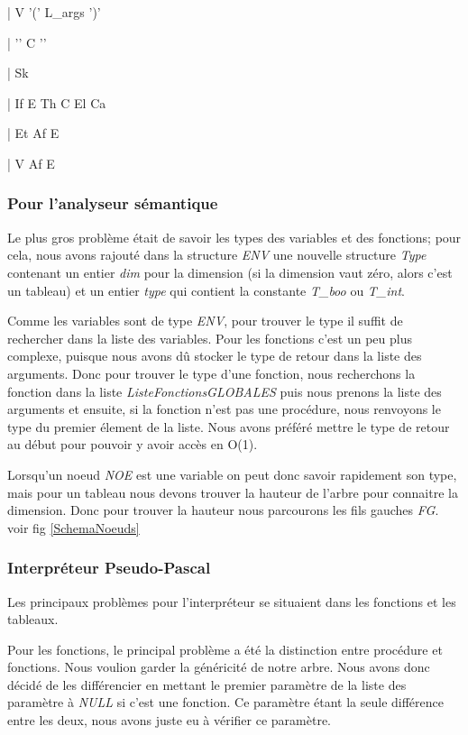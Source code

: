 \documentclass[10pt,a4paper]{article}
\begin{document}
| V '(' L\_args ')'
    
| '{' C '}'
    
| Sk
    
| If E Th C El Ca
    
| Et Af E

| V Af E



\subsubsection {Pour l'analyseur sémantique}
Le plus gros problème était de savoir les types des variables et des fonctions; pour cela, nous avons rajouté dans la structure \textit{ENV} une nouvelle structure \textit{Type} contenant un entier \textit{dim} pour la dimension (si la dimension vaut zéro, alors c'est un tableau) et un entier \textit{type} qui contient la constante \textit{T\_boo} ou \textit{T\_int}.

Comme les variables sont de type \textit{ENV}, pour trouver le type il suffit de rechercher dans la liste des variables. Pour les fonctions c'est un peu plus complexe, puisque nous avons dû stocker le type de retour dans la liste des arguments. Donc pour trouver le type d'une fonction, nous recherchons la fonction dans la liste \textit{ListeFonctionsGLOBALES} puis nous prenons la liste des arguments et ensuite, si la fonction n'est pas une procédure, nous renvoyons le type du premier élement de la liste. Nous avons préféré mettre le type de retour au début pour pouvoir y avoir accès en O(1).

Lorsqu'un noeud \textit{NOE} est une variable on peut donc savoir rapidement son type, mais pour un tableau nous devons trouver la hauteur de l'arbre pour connaitre la dimension. Donc pour trouver la hauteur nous parcourons les fils gauches \textit{FG}. voir fig \ref{SchemaNoeuds}


\subsubsection{Interpréteur Pseudo-Pascal}

Les principaux problèmes pour l'interpréteur se situaient dans les fonctions et les tableaux.

Pour les fonctions, le principal problème a été la distinction entre procédure et fonctions. Nous voulion garder la généricité de notre arbre. Nous avons donc décidé de les différencier en mettant le premier paramètre de la liste des paramètre à \textit{NULL} si c'est une fonction. Ce paramètre étant la seule différence entre les deux,  nous avons juste eu à vérifier ce paramètre.
\end{document}
